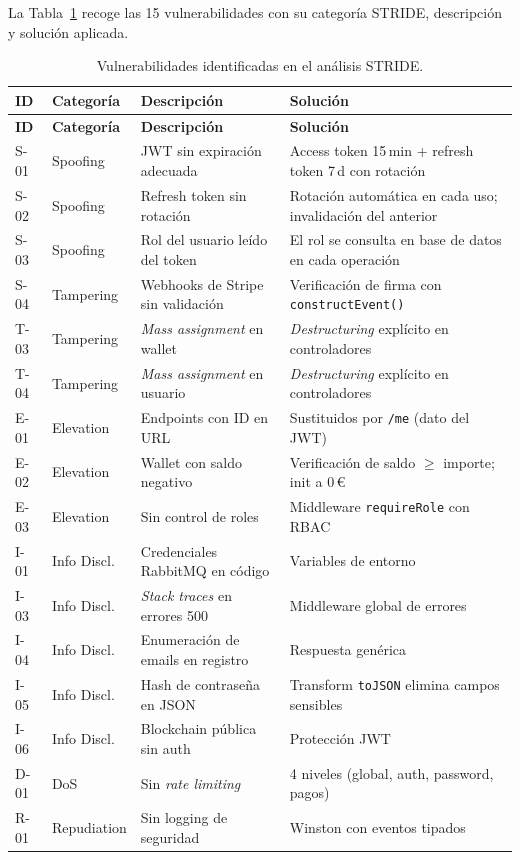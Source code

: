La Tabla~\ref{tab:vulnerabilidades} recoge las 15 vulnerabilidades con su categoría STRIDE, descripción y solución aplicada.

\begin{longtable}{p{1cm}p{2.2cm}p{5cm}p{5cm}}
\caption{Vulnerabilidades identificadas en el análisis STRIDE.}\label{tab:vulnerabilidades} \\
\toprule
\textbf{ID} & \textbf{Categoría} & \textbf{Descripción} & \textbf{Solución} \\
\midrule
\endfirsthead
\toprule
\textbf{ID} & \textbf{Categoría} & \textbf{Descripción} & \textbf{Solución} \\
\midrule
\endhead
S-01 & Spoofing & JWT sin expiración adecuada & Access token 15\,min + refresh token 7\,d con rotación \\
S-02 & Spoofing & Refresh token sin rotación & Rotación automática en cada uso; invalidación del anterior \\
S-03 & Spoofing & Rol del usuario leído del token & El rol se consulta en base de datos en cada operación \\
S-04 & Tampering & Webhooks de Stripe sin validación & Verificación de firma con \texttt{constructEvent()} \\
T-03 & Tampering & \emph{Mass assignment} en wallet & \emph{Destructuring} explícito en controladores \\
T-04 & Tampering & \emph{Mass assignment} en usuario & \emph{Destructuring} explícito en controladores \\
E-01 & Elevation & Endpoints con ID en URL & Sustituidos por \texttt{/me} (dato del JWT) \\
E-02 & Elevation & Wallet con saldo negativo & Verificación de saldo $\geq$ importe; init a 0\,\euro{} \\
E-03 & Elevation & Sin control de roles & Middleware \texttt{requireRole} con RBAC \\
I-01 & Info Discl. & Credenciales RabbitMQ en código & Variables de entorno \\
I-03 & Info Discl. & \emph{Stack traces} en errores 500 & Middleware global de errores \\
I-04 & Info Discl. & Enumeración de emails en registro & Respuesta genérica \\
I-05 & Info Discl. & Hash de contraseña en JSON & Transform \texttt{toJSON} elimina campos sensibles \\
I-06 & Info Discl. & Blockchain pública sin auth & Protección JWT \\
D-01 & DoS & Sin \emph{rate limiting} & 4 niveles (global, auth, password, pagos) \\
R-01 & Repudiation & Sin logging de seguridad & Winston con eventos tipados \\
\bottomrule
\end{longtable}

